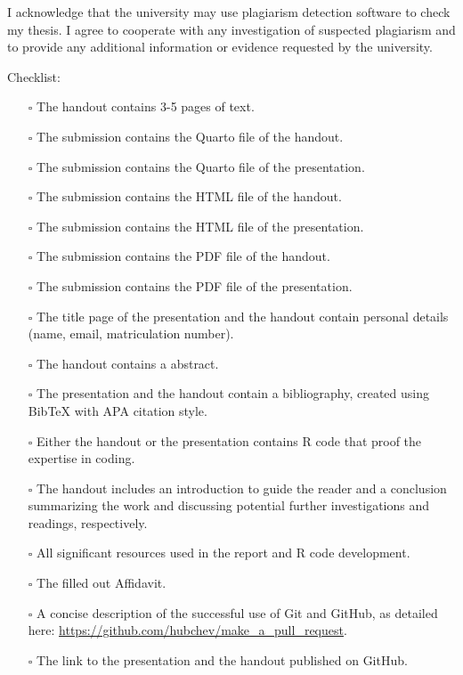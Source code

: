 \documentclass[
  man,
  floatsintext,
  longtable,
  nolmodern,
  notxfonts,
  notimes,
  colorlinks=true,linkcolor=blue,citecolor=blue,urlcolor=blue]{apa7}
\providecommand{\tightlist}{%
  \setlength{\itemsep}{0pt}\setlength{\parskip}{0pt}}
\begin{document}
I acknowledge that the university may use plagiarism detection software
to check my thesis. I agree to cooperate with any investigation of
suspected plagiarism and to provide any additional information or
evidence requested by the university.

Checklist:

\begin{itemize}
\tightlist
\item[$\square$]
  The handout contains 3-5 pages of text.
\item[$\square$]
  The submission contains the Quarto file of the handout.
\item[$\square$]
  The submission contains the Quarto file of the presentation.
\item[$\square$]
  The submission contains the HTML file of the handout.
\item[$\square$]
  The submission contains the HTML file of the presentation.
\item[$\square$]
  The submission contains the PDF file of the handout.
\item[$\square$]
  The submission contains the PDF file of the presentation.
\item[$\square$]
  The title page of the presentation and the handout contain personal
  details (name, email, matriculation number).
\item[$\square$]
  The handout contains a abstract.
\item[$\square$]
  The presentation and the handout contain a bibliography, created using
  BibTeX with APA citation style.
\item[$\square$]
  Either the handout or the presentation contains R code that proof the
  expertise in coding.
\item[$\square$]
  The handout includes an introduction to guide the reader and a
  conclusion summarizing the work and discussing potential further
  investigations and readings, respectively.
\item[$\square$]
  All significant resources used in the report and R code development.
\item[$\square$]
  The filled out Affidavit.
\item[$\square$]
  A concise description of the successful use of Git and GitHub, as
  detailed here: \url{https://github.com/hubchev/make_a_pull_request}.
\item[$\square$]
  The link to the presentation and the handout published on GitHub.
\end{itemize}
\end{document}
